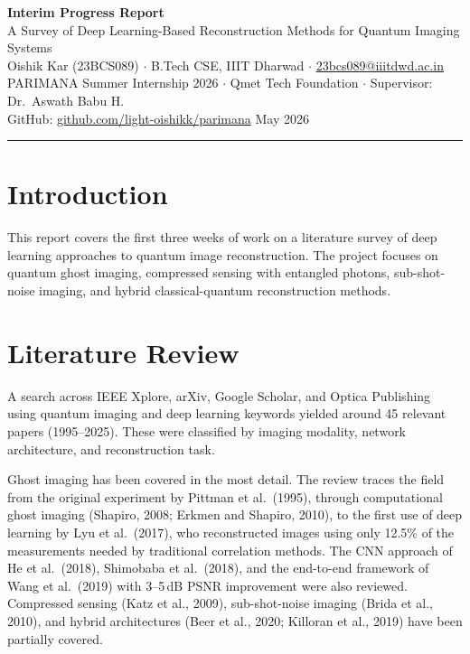 \documentclass[11pt,a4paper]{article}
\begin{document}
\begin{center}
{\Large\bfseries Interim Progress Report}\\[3pt]
{\normalsize A Survey of Deep Learning-Based Reconstruction Methods for Quantum Imaging Systems}\\[3pt]
{\small Oishik Kar (23BCS089) $\cdot$ B.Tech CSE, IIIT Dharwad $\cdot$ \href{mailto:23bcs089@iiitdwd.ac.in}{23bcs089@iiitdwd.ac.in}}\\[1pt]
{\small PARIMANA Summer Internship 2026 $\cdot$ Qmet Tech Foundation $\cdot$ Supervisor: Dr.\ Aswath Babu H.}\\[1pt]
{\small GitHub: \href{https://github.com/light-oishikk/parimana}{github.com/light-oishikk/parimana} \hfill May 2026}
\end{center}

\vspace{-2pt}
\rule{\textwidth}{0.8pt}

\section{Introduction}

This report covers the first three weeks of work on a literature survey of deep learning approaches to quantum image reconstruction. The project focuses on quantum ghost imaging, compressed sensing with entangled photons, sub-shot-noise imaging, and hybrid classical-quantum reconstruction methods.

\section{Literature Review}

A search across IEEE Xplore, arXiv, Google Scholar, and Optica Publishing using quantum imaging and deep learning keywords yielded around 45 relevant papers (1995--2025). These were classified by imaging modality, network architecture, and reconstruction task.

Ghost imaging has been covered in the most detail. The review traces the field from the original experiment by Pittman et al.\ (1995), through computational ghost imaging (Shapiro, 2008; Erkmen and Shapiro, 2010), to the first use of deep learning by Lyu et al.\ (2017), who reconstructed images using only 12.5\% of the measurements needed by traditional correlation methods. The CNN approach of He et al.\ (2018), Shimobaba et al.\ (2018), and the end-to-end framework of Wang et al.\ (2019) with 3--5\,dB PSNR improvement were also reviewed. Compressed sensing (Katz et al., 2009), sub-shot-noise imaging (Brida et al., 2010), and hybrid architectures (Beer et al., 2020; Killoran et al., 2019) have been partially covered.
\end{document}
